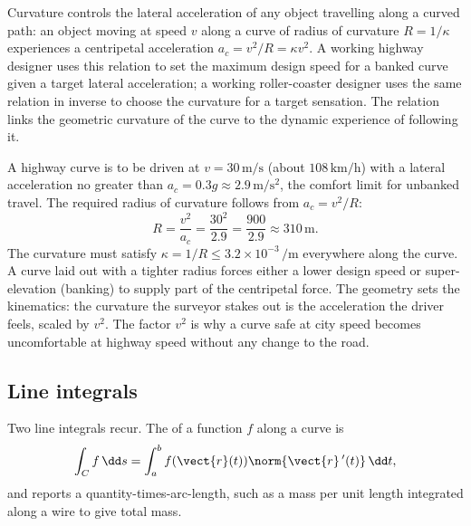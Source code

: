 Curvature controls the lateral acceleration of any object travelling
along a curved path: an object moving at speed $v$ along a curve of
radius of curvature $R = 1/\kappa$ experiences a centripetal
acceleration $a_{c} = v^{2}/R = \kappa v^{2}$. A working highway
designer uses this relation to set the maximum design speed for a
banked curve given a target lateral acceleration; a working
roller-coaster designer uses the same relation in inverse to choose
the curvature for a target sensation. The relation links the
geometric curvature of the curve to the dynamic experience of
following it.

\begin{example}
A highway curve is to be driven at $v = 30\,\si{\meter\per\second}$
(about $108\,\si{\kilo\meter\per\hour}$) with a lateral acceleration
no greater than $a_{c} = 0.3g \approx 2.9\,\si{\meter\per\second
\squared}$, the comfort limit for unbanked travel. The required
radius of curvature follows from $a_{c} = v^{2}/R$:
\[
R = \frac{v^{2}}{a_{c}} = \frac{30^{2}}{2.9} = \frac{900}{2.9}
\approx 310\,\si{\meter}.
\]
The curvature must satisfy $\kappa = 1/R \leq 3.2\times 10^{-3}\,
\si{\per\meter}$ everywhere along the curve. A curve laid out with a
tighter radius forces either a lower design speed or super-elevation
(banking) to supply part of the centripetal force. The geometry sets
the kinematics: the curvature the surveyor stakes out is the
acceleration the driver feels, scaled by $v^{2}$. The factor $v^{2}$
is why a curve safe at city speed becomes uncomfortable at highway
speed without any change to the road.
\end{example}

\subsection{Line integrals}

Two line integrals recur. The  of a
function $f$ along a curve is
\[
\int_{C} f \,\dd s = \int_{a}^{b} f(\vect{r}(t)) \norm{\vect{r}\,'(t)}
\,\dd t,
\]
and reports a quantity-times-arc-length, such as a mass per unit
length integrated along a wire to give total mass.

